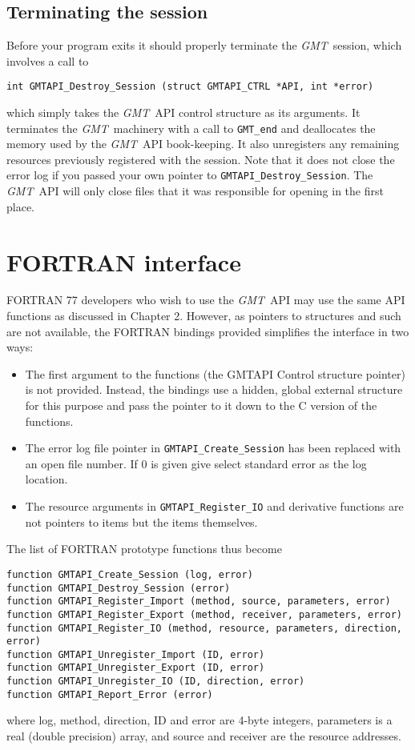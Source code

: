 \documentclass{report}
\newcommand{\GMT}{\textit{GMT}}%
\newcommand{\GMT}{\htmladdnormallink{\texttt{[image: eps/GMT\_glyph10.eps]}}{http://gmt.soest.hawaii.edu}}%
\newcommand{\GMT}{\htmladdnormallink{\textbf{GMT}}{http://gmt.soest.hawaii.edu}}%
\begin{document}
\section{Terminating the session}
\index{GMT@\GMT!Terminating the session}

Before your program exits it should properly terminate the \GMT\ session, which involves a call to

\begin{verbatim}
int GMTAPI_Destroy_Session (struct GMTAPI_CTRL *API, int *error)
\end{verbatim}
which simply takes the \GMT\ API control structure as its arguments.  It terminates the \GMT\ machinery
with a call to \texttt{GMT\_end} and deallocates the memory used by the \GMT\ API book-keeping. It
also unregisters any remaining resources previously registered with the session.
Note that it does not close the error log if you passed your own pointer to \texttt{GMTAPI\_Destroy\_Session}.
The \GMT\ API will only close files that it was responsible for opening in the first place.

\chapter{FORTRAN interface} 

FORTRAN 77 developers who wish to use the \GMT\ API may use the same API functions as discussed in Chapter 2.
However, as pointers to structures and such are not available, the FORTRAN bindings provided simplifies the
interface in two ways:
\begin{itemize}
\item The first argument to the functions (the GMTAPI Control structure pointer) is not provided.  Instead,
the bindings use a hidden, global external structure for this purpose and pass the pointer to it down to
the C version of the functions.
\item The error log file pointer in \texttt{GMTAPI\_Create\_Session} has been replaced with an open file
number.  If 0 is given give select standard error as the log location.
\item The resource arguments in \texttt{GMTAPI\_Register\_IO} and derivative functions are not pointers to
items but the items themselves.
\end{itemize}
The list of FORTRAN prototype functions thus become
\begin{verbatim}
function GMTAPI_Create_Session (log, error)
function GMTAPI_Destroy_Session (error)
function GMTAPI_Register_Import (method, source, parameters, error)
function GMTAPI_Register_Export (method, receiver, parameters, error)
function GMTAPI_Register_IO (method, resource, parameters, direction, error)
function GMTAPI_Unregister_Import (ID, error)
function GMTAPI_Unregister_Export (ID, error)
function GMTAPI_Unregister_IO (ID, direction, error)
function GMTAPI_Report_Error (error)
\end{verbatim}
where log, method, direction, ID and error are 4-byte integers, parameters is a real (double precision) array,
and source and receiver are the resource addresses.
\end{document}
